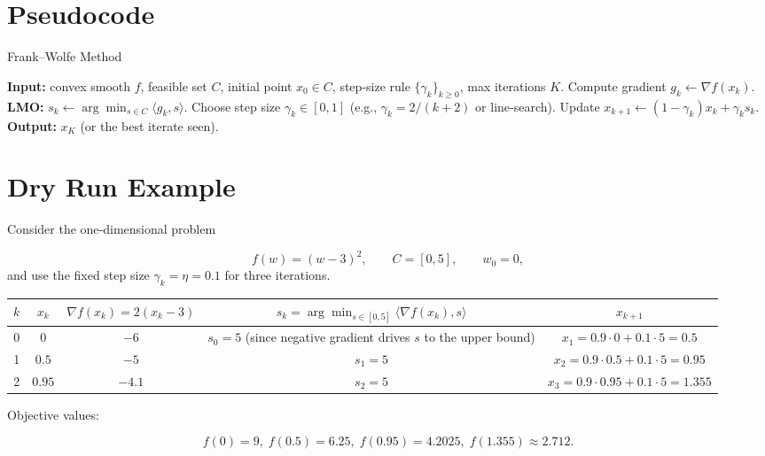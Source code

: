 \documentclass{article}
\begin{document}
\section*{Pseudocode}
\begin{algorithm}[H]
\caption{Frank–Wolfe Method}
\begin{algorithmic}[1]
\State \textbf{Input:} convex smooth $f$, feasible set $C$, initial point $x_0\in C$, step‑size rule $\{\gamma_k\}_{k\ge0}$, max iterations $K$.
    \State Compute gradient $g_k \gets \nabla f(x_k)$.
    \State \textbf{LMO:} $s_k \gets \arg\min_{s\in C}\langle g_k, s\rangle$.
    \State Choose step size $\gamma_k\in[0,1]$ (e.g., $\gamma_k=2/(k+2)$ or line‑search).
    \State Update $x_{k+1} \gets (1-\gamma_k)x_k + \gamma_k s_k$.
\EndFor
\State \textbf{Output:} $x_K$ (or the best iterate seen).
\end{algorithmic}
\end{algorithm}

\section*{Dry Run Example}
Consider the one‑dimensional problem  

\[
f(w) = (w-3)^2,\qquad C=[0,5],\qquad w_0=0,
\]
and use the fixed step size $\gamma_k = \eta =0.1$ for three iterations.

\begin{center}
\begin{tabular}{c|c|c|c|c}
 $k$ & $x_k$ & $\nabla f(x_k)=2(x_k-3)$ & $s_k=\arg\min_{s\in[0,5]}\langle \nabla f(x_k),s\rangle$ & $x_{k+1}$ \\ \hline
0 & $0$ & $-6$ & $s_0 = 5$ (since negative gradient drives $s$ to the upper bound) & $x_1 = 0.9\cdot0 +0.1\cdot5 = 0.5$\\
1 & $0.5$ & $-5$ & $s_1 = 5$ & $x_2 = 0.9\cdot0.5+0.1\cdot5 = 0.95$\\
2 & $0.95$ & $-4.1$ & $s_2 = 5$ & $x_3 = 0.9\cdot0.95+0.1\cdot5 = 1.355$\\
\end{tabular}
\end{center}

Objective values:

\[
f(0)=9,\; f(0.5)=6.25,\; f(0.95)=4.2025,\; f(1.355)\approx 2.712.
\]
\end{document}
